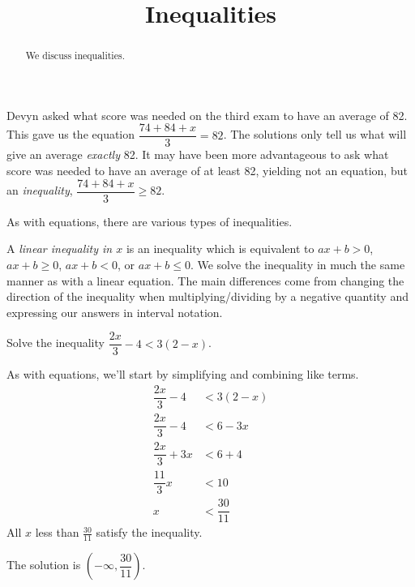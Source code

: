 \documentclass{ximera}
\title[Dig-In:]{Inequalities}
\begin{document}
\begin{abstract}
  We discuss inequalities.
\end{abstract}
\maketitle

Devyn asked what score was needed on the third exam to have an average of 82.  This gave us the equation $\displaystyle \dfrac{74 + 84 + x}{3} = 82$.  
The solutions only tell us what will give an average \emph{exactly} 82.  It may have been more advantageous to ask what score was needed to have an
average of at least 82, yielding not an equation, but an \emph{inequality}, $\displaystyle \dfrac{74+84+x}{3} \geq 82$.

As with equations, there are various types of inequalities.  

A \emph{linear inequality in $x$} is an inequality which is equivalent to  $ax + b >0$, $ax + b \geq 0$, $ax+b < 0$, or $ax + b \leq 0$.
We solve the inequality in much the same manner as with a linear equation.  The main differences come from changing the direction of the inequality when multiplying/dividing
by a negative quantity and expressing our answers in interval notation.

\begin{example}
 	Solve the inequality $\displaystyle \dfrac{2x}{3}-4 < 3\left( 2-x \right)$.
	\begin{explanation}
    		As with equations, we'll start by simplifying and combining like terms.
		\begin{align*}
			\dfrac{2x}{3} -4 &< 3\left( 2-x \right)\\
			\dfrac{2x}{3} - 4 &< 6 - 3x\\
			\dfrac{2x}{3}+3x &< 6 + 4\\
			\dfrac{11}{3} x &< 10\\
			x &< \dfrac{30}{11}
		\end{align*}
		All $x$ less than $\frac{30}{11}$ satisfy the inequality.
		
		The solution is $\left( -\infty , \dfrac{30}{11} \right)$.
	\end{explanation}
\end{example}
\end{document}
